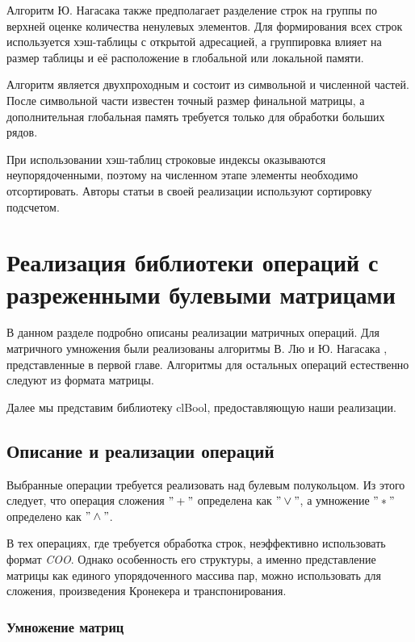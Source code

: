 \documentclass[14pt]{extarticle}
\begin{document}
	Алгоритм Ю. Нагасака \cite{nagasaka} также предполагает разделение строк на группы по верхней оценке количества ненулевых элементов. Для формирования всех строк используется хэш-таблицы с открытой адресацией, а группировка влияет на размер таблицы и её расположение в глобальной или локальной памяти. 
	
	Алгоритм является двухпроходным и состоит из символьной и численной частей. После символьной части известен точный размер финальной матрицы, а дополнительная глобальная память требуется только для обработки больших рядов. 
	
	При использовании хэш-таблиц строковые индексы оказываются неупорядоченными, поэтому на численном этапе элементы необходимо отсортировать. Авторы статьи в своей реализации используют сортировку подсчетом.    
	
\section{Реализация библиотеки операций с разреженными булевыми матрицами}
	
	
	В данном разделе подробно описаны реализации матричных операций. Для матричного умножения были реализованы алгоритмы В. Лю \cite{liu} и Ю. Нагасака \cite{nagasaka}, представленные в первой главе. Алгоритмы для остальных операций естественно следуют из формата матрицы.
	
	Далее мы представим библиотеку clBool\cite{clbool}, предоставляющую наши реализации.   
	
	\subsection{Описание и реализации операций} \label{details}
	
	Выбранные операции требуется реализовать над булевым полукольцом. Из этого следует, что операция сложения $"+"$ определена как $"\lor"$, а умножение $"*"$ определено как $"\land"$.
	
	В тех операциях, где требуется обработка строк, неэффективно использовать формат \textit{COO}. Однако особенность его структуры, а именно представление матрицы как единого упорядоченного массива пар, можно использовать для сложения, произведения Кронекера и транспонирования.
	
	\subsubsection{Умножение матриц}
	
\end{document}
